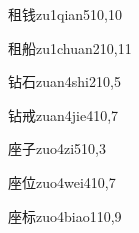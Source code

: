 \begin{verbete}{租钱}{zu1qian5}{10,10}
\end{verbete}

\begin{verbete}{租船}{zu1chuan2}{10,11}
\end{verbete}

\begin{verbete}{钻石}{zuan4shi2}{10,5}
\end{verbete}

\begin{verbete}{钻戒}{zuan4jie4}{10,7}
\end{verbete}

\begin{verbete}{座子}{zuo4zi5}{10,3}
\end{verbete}

\begin{verbete}{座位}{zuo4wei4}{10,7}
\end{verbete}

\begin{verbete}{座标}{zuo4biao1}{10,9}
\end{verbete}



